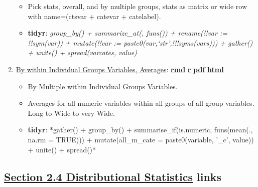 \documentclass[
]{book}
\providecommand{\tightlist}{%
  \setlength{\itemsep}{0pt}\setlength{\parskip}{0pt}}
\begin{document}
\begin{enumerate}
  \begin{itemize}
  \tightlist
  \item
    Pick stats, overall, and by multiple groups, stats as matrix or wide row with name=(ctsvar + catevar + catelabel).
  \item
    \textbf{tidyr}: \emph{group\_by() + summarize\_at(, funs()) + rename(!!var := !!sym(var)) + mutate(!!var := paste0(var,`str',!!!syms(vars))) + gather() + unite() + spread(varcates, value)}
  \end{itemize}
\item
  \href{https://fanwangecon.github.io/R4Econ/summarize/aggregate/htmlpdfr/fs_group_summ_wide.html}{By within Individual Groups Variables, Averages}: \href{https://github.com/FanWangEcon/R4Econ/blob/master/summarize/aggregate//fs_group_summ_wide.Rmd}{\textbf{rmd}} \textbar{} \href{https://github.com/FanWangEcon/R4Econ/blob/master/summarize/aggregate/htmlpdfr/fs_group_summ_wide.R}{\textbf{r}} \textbar{} \href{https://github.com/FanWangEcon/R4Econ/blob/master/summarize/aggregate/htmlpdfr/fs_group_summ_wide.pdf}{\textbf{pdf}} \textbar{} \href{https://fanwangecon.github.io/R4Econ/summarize/aggregate/htmlpdfr/fs_group_summ_wide.html}{\textbf{html}}

  \begin{itemize}
  \tightlist
  \item
    By Multiple within Individual Groups Variables.
  \item
    Averages for all numeric variables within all groups of all group variables. Long to Wide to very Wide.
  \item
    \textbf{tidyr}: *gather() + group\_by() + summarise\_if(is.numeric, funs(mean(., na.rm = TRUE))) + mutate(all\_m\_cate = paste0(variable, '\_c', value)) + unite() + spread()*
  \end{itemize}
\end{enumerate}

\hypertarget{section-2.4-distributional-statisticsdistributional-statistics-links}{%
\subsection{\texorpdfstring{\protect\hyperlink{distributional-statistics}{Section 2.4 Distributional Statistics} links}{Section 2.4 Distributional Statistics links}}\label{section-2.4-distributional-statisticsdistributional-statistics-links}}
\end{document}
